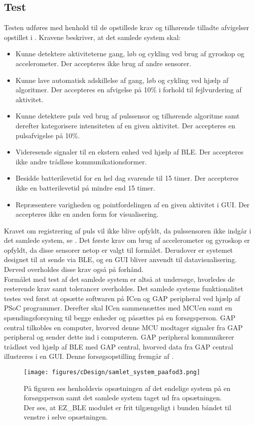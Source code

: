 \subsection{Test}
Testen udføres med henhold til de opstillede krav og tilhørende tilladte afvigelser opstillet i . Kravene beskriver, at det samlede system skal:
\begin{itemize}
	\item Kunne detektere aktiviteterne gang, løb og cykling ved brug af gyroskop og accelerometer. Der accepteres ikke brug af andre sensorer.
	\item Kunne lave automatisk adskillelse af gang, løb og cykling ved hjælp af algoritmer. Der accepteres en afvigelse på 10\% i forhold til fejlvurdering af aktivitet.
	\item Kunne detektere puls ved brug af pulssensor og tilhørende algoritme samt derefter kategorisere intensiteten af en given aktivitet. Der accepteres en pulsafvigelse på 10\%.
	\item Videresende signaler til en ekstern enhed ved hjælp af BLE. Der accepteres ikke andre trådløse kommunikationsformer.
	\item Besidde batterilevetid for en hel dag svarende til 15 timer. Der accepteres ikke en batterilevetid på mindre end 15 timer.
	\item Repræsentere varigheden og pointfordelingen af en given aktivitet i GUI. Der accepteres ikke en anden form for visualisering. 
\end{itemize}
Kravet om registrering af puls vil ikke blive opfyldt, da pulssensoren ikke indgår i det samlede system, se . Det første krav om brug af accelerometer og gyroskop er opfyldt, da disse sensorer netop er valgt til formålet. Derudover er systemet designet til at sende via BLE, og en GUI bliver anvendt til datavisualisering. Derved overholdes disse krav også på forhånd. \\
Formålet med test af det samlede system er altså at undersøge, hvorledes de resterende krav samt tolerancer overholdes. Det samlede systems funktionalitet testes ved først at opsætte softwaren på ICen og GAP peripheral ved hjælp af PSoC programmer. Derefter skal ICen sammensættes med MCUen samt en spændingsforsyning til begge enheder og påsættes på en forsøgsperson. GAP central tilkobles en computer, hvorved denne MCU modtager signaler fra GAP peripheral og sender dette ind i computeren. GAP peripheral kommunikerer trådløst ved hjælp af BLE med GAP central, hvorved data fra GAP central illustreres i en GUI. Denne forsøgsopstilling fremgår af .
\begin{figure}[H]
	\centering
	\texttt{[image: figures/cDesign/samlet\_system\_paafod3.png]}
	\caption{På figuren ses henholdsvis opsætningen af det endelige system på en forsøgsperson samt det samlede system taget ud fra opsætningen. Der ses, at EZ\_BLE modulet er frit tilgængeligt i bunden båndet til venstre i selve opsætningen.}
	\label{fig:samlede_system_opstilling}
\end{figure}

